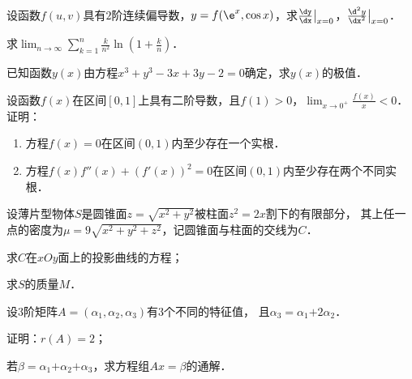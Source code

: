 \documentclass[plain,noanswer,medmath]{../../template/jnuexam}
\begin{document}


\begin{problem}[points=10]
设函数$f(u,v)$具有$2$阶连续偏导数，$y = f(\e^x,\cos x)$，求$\frac{\dy}{\dx}\big|_{x = 0}$，$\frac{\d^2y}{\dx^2}\big|_{x = 0}$．
\end{problem}


\begin{problem}[points=10]
求$\lim_{n \to \infty} \sum_{k = 1}^n \frac{k}{n^2} \ln \left(1 + \frac{k}{n} \right)$．
\end{problem}


\begin{problem}[points=10]
已知函数$y(x)$由方程$x^3 + y^3 - 3x + 3y - 2 = 0$确定，求$y(x)$的极值．
\end{problem}


\begin{problem}[points=11]
设函数$f(x)$在区间$[0,1]$上具有二阶导数，且$f(1) > 0$，$\lim_{x \to 0^+} \frac{f(x)}{x} < 0$．证明：
\begin{enumerate}
\item 方程$f(x) = 0$在区间$(0,1)$内至少存在一个实根．
\item 方程$f(x)f''(x) + \left(f'(x) \right)^2 = 0$在区间$(0,1)$内至少存在两个不同实根．
\end{enumerate}
\end{problem}


\begin{problem}[points=10]
设薄片型物体$S$是圆锥面$z = \sqrt{x^2 + y^2}$被柱面$z^2 = 2x$割下的有限部分，
其上任一点的密度为$\mu = 9\sqrt{x^2 + y^2 + z^2}$，记圆锥面与柱面的交线为$C$．\par
\begin{enumerate*}
\item 求$C$在$xOy$面上的投影曲线的方程；
\item 求$S$的质量$M$．
\end{enumerate*}
\end{problem}


\begin{problem}[points=11]
设$3$阶矩阵$A= (\alpha_1,\alpha_2,\alpha_3)$有$3$个不同的特征值，
且$\alpha_3=\alpha_1\text{+}2\alpha_2$．\par
\begin{enumerate*}
\item 证明：$r(A) = 2$；
\item 若$\beta =\alpha_1\text{+}\alpha_2\text{+}\alpha_3$，求方程组$Ax = \beta$的通解．
\end{enumerate*}
\end{problem}
\end{document}
